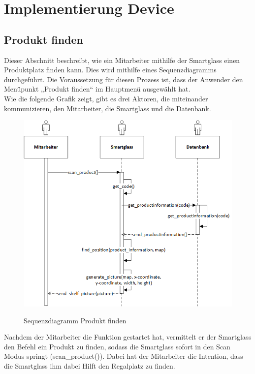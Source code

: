 \chapter{Implementierung Device}
\label{cha:impl_device}

\section{Produkt finden}
\label{sec:produkt_finden}
Dieser Abschnitt beschreibt, wie ein Mitarbeiter mithilfe der Smartglass einen Produktplatz finden kann. Dies wird mithilfe eines Sequenzdiagramms durchgeführt. Die Voraussetzung für diesen Prozess ist, dass der Anwender den Menüpunkt „Produkt finden“ im Hauptmenü ausgewählt hat.\\

Wie die folgende Grafik zeigt, gibt es drei Aktoren, die miteinander kommunizieren, den Mitarbeiter, die Smartglass und die Datenbank.
\begin{figure}[H]
	\centering
	{\includegraphics[scale=0.8]{Bilder/Abbildungen/SMAR_produkt_finden_Sequenzdiagramm.png}}
	\caption{Sequenzdiagramm Produkt finden}
	\label{fig:jwt_encode}
\end{figure}
Nachdem der Mitarbeiter die Funktion gestartet hat, vermittelt er der Smartglass den Befehl ein Produkt zu finden, sodass die Smartglass sofort in den Scan Modus springt (scan\_product()). Dabei hat der Mitarbeiter die Intention, dass die Smartglass ihm dabei Hilft den Regalplatz zu finden.\\

